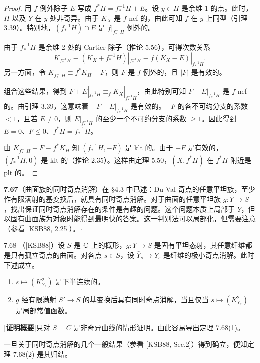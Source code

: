 \begin{proof}
用 $f$-例外除子 $E$ 写成 $f^*H=f_*^{-1}H+E$。设 $y\in H$ 是余维 1 的点。此时，$H$ 以及 $Y$ 在 $y$ 处非奇异。由于 $K_X$ 是 $f$-nef 的，由此可知 $f$ 在 $y$ 上同型（引理 3.39）。特别地，$(f_*^{-1}H)\cap E$ 是 $f|_{f_*^{-1}H}$ 例外的。

由于 $f_*^{-1}H$ 是余维 2 处的 Cartier 除子（推论 5.56），可得次数关系
\[
K_{f_*^{-1}H}\equiv(K_X+f_*^{-1}H)|_{f_*^{-1}H}\equiv f(K_X-E)|_{f_*^{-1}H}.
\]
另一方面，令 $K_{f_*^{-1}H}\equiv f^*K_H+F$，则 $F$ 是 $f$-例外的，且 $|F|$ 是有效的。

组合这些结果，得到 $F+E|_{f_*^{-1}H}\equiv_f K_X|_{f_*^{-1}H}$，由此特别可知 $F+E|_{f_*^{-1}H}$ 是 $f$-nef 的。由引理 3.39，这意味着 $-F-E|_{f_*^{-1}H}$ 是有效的。$-F$ 的各不可约分支的系数 $<1$，且若 $E\ne0$，则 $E|_{f_*^{-1}H}$ 的至少一个不可约分支的系数 $\ge1$。因此得到 $E=0$、$F\le0$、$f^*H=f_*^{-1}H$。

由 $K_{f_*^{-1}H}-F\equiv f^*K_H$ 知 $(f_*^{-1}H,-F)$ 是 klt 的。由于 $-F$ 是有效的，$(f_*^{-1}H,0)$ 是 klt 的（推论 2.35）。这样由定理 5.50，$(X,f^*H)$ 在 $f^*H$ 附近是 plt 的。
\end{proof}

\par\medskip\noindent\textbf{7.67}（曲面族的同时奇点消解）\quad 在 §4.3 中已述：Du Val 奇点的任意平坦族，至少作有限满射的基变换后，就具有同时奇点消解。对于曲面的任意平坦族 $g\colon Y\to S$，找出保证同时奇点消解存在的条件是有趣的问题。这个问题本质上局部于 $Y$，但以固有曲面族为对象时能得到最明快的答案。这一判别法可以局部化，但需要注意（参看 [KSB88, 2.25]）。\hfill$\square$

\begin{theoremp}{7.68}
（[KSB88]）设 $S$ 是 $\mathbb{C}$ 上的概形，$g\colon Y\to S$ 是固有平坦态射，其任意纤维都是只有孤立奇点的曲面。对各点 $s\in S$，设 $\bar Y_s\to Y_s$ 是纤维的极小奇点消解。此时下述成立。
\begin{enumerate}[label=(\arabic*),leftmargin=2.4em,itemsep=1pt,topsep=2pt,parsep=0pt]
\item $s\mapsto(K_{Y_s}^2)$ 是下半连续的。
\item $g$ 经有限满射 $S'\to S$ 的基变换后具有同时奇点消解，当且仅当 $s\mapsto(K_{Y_s}^2)$ 是局部常值函数。
\end{enumerate}
\end{theoremp}

\textbf{[证明概要]}\quad 只对 $S=C$ 是非奇异曲线的情形证明。由此容易导出定理 7.68(1)。

一旦关于同时奇点消解的几个一般结果（参看 [KSB88, Sec.2]）得到确立，便知定理 7.68(2) 是其归结。

